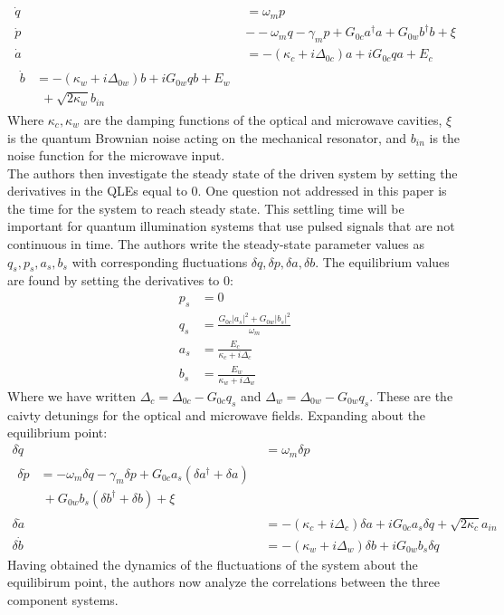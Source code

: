 \documentclass[a4paper,11pt, twocolumn]{article}
\numberwithin{equation}{section}
\begin{document}
\begin{align}
 \dot{q} &= \omega_mp\\
 \dot{p} &- -\omega_mq-\gamma_mp+G_{0c}a^\dagger a+G_{0w}b^\dagger b +\xi\\
 \dot{a} &= -(\kappa_c+i\Delta_{0c})a+iG_{0c}qa+E_c\\
 \begin{split}
 \dot{b} &= -(\kappa_w+i\Delta_{0w})b+iG_{0w}qb+E_w\\
         &\ \ +\sqrt{2\kappa_w}b_{in}
 \end{split}
\end{align}
Where $\kappa_c,\kappa_w$ are the damping functions of the optical and microwave cavities, $\xi$ is the quantum Brownian noise acting on the mechanical resonator,
and $b_{in}$ is the noise function for the microwave input.\\
The authors then investigate the steady state of the driven system by setting the derivatives in the QLEs equal to 0. 
One question not addressed in this paper is the time for the system to reach steady state. 
This settling time will be important for quantum illumination systems that use pulsed signals that are not continuous in time.
The authors  write the steady-state parameter values as $q_s,p_s,a_s, b_s$ with corresponding fluctuations $\delta q,\delta p,\delta a,\delta b$.
The equilibrium values are found by setting the derivatives to 0:
\begin{align}
 p_s &= 0\\
 q_s &= \frac{G_{0c}|a_s|^2+G_{0w}|b_s|^2}{\omega_m}\\
 a_s &= \frac{E_c}{\kappa_c+i\Delta_c}\\
 b_s &= \frac{E_w}{\kappa_w+i\Delta_w}
\end{align}
Where we have written $\Delta_c=\Delta_{0c}-G_{0c}q_s$ and $\Delta_w=\Delta_{0w}-G_{0w}q_s$. 
These are the caivty detunings for the optical and microwave fields. 
Expanding about the equilibrium point:
\begin{align}
 \delta\dot{q} &= \omega_m\delta p\\
 \begin{split}
 \delta\dot{p} &= -\omega_m\delta q -\gamma_m\delta p +G_{0c}a_s(\delta a^\dagger+\delta a)\\
               &\ +G_{0w}b_s(\delta b^\dagger+\delta b)+\xi
 \end{split}\\
 \delta\dot{a} &= -(\kappa_c+i\Delta_c)\delta a + iG_{0c}a_s\delta q + \sqrt{2\kappa_c}a_{in}\\
 \delta\dot{b} &= -(\kappa_w+i\Delta_w)\delta b + iG_{0w}b_s\delta q
\end{align}
Having obtained the dynamics of the fluctuations of the system about the equilibirum point, the authors now analyze the correlations between the three component systems.
\end{document}

